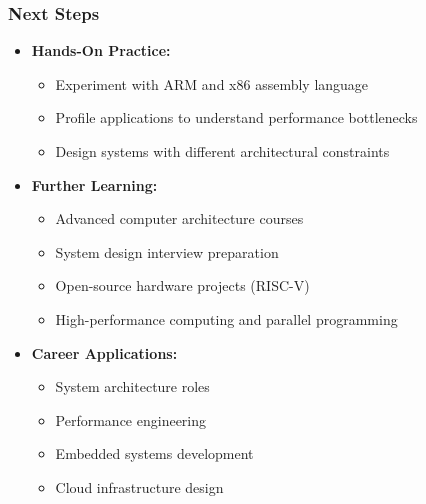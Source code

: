 \documentclass[aspectratio=169,xcolor=dvipsnames]{beamer}
\begin{document}
\begin{frame}
    \frametitle{Next Steps}
    \begin{itemize}
        \item \textbf{Hands-On Practice:}
        \begin{itemize}
            \item Experiment with ARM and x86 assembly language
            \item Profile applications to understand performance bottlenecks
            \item Design systems with different architectural constraints
        \end{itemize}
        \item \textbf{Further Learning:}
        \begin{itemize}
            \item Advanced computer architecture courses
            \item System design interview preparation
            \item Open-source hardware projects (RISC-V)
            \item High-performance computing and parallel programming
        \end{itemize}
        \item \textbf{Career Applications:}
        \begin{itemize}
            \item System architecture roles
            \item Performance engineering
            \item Embedded systems development
            \item Cloud infrastructure design
        \end{itemize}
    \end{itemize}
\end{frame}
\end{document}
